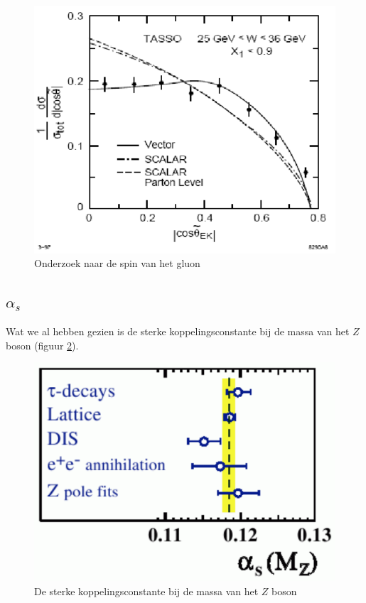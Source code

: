 \documentclass[../main.tex]{subfiles}
\begin{document}
\begin{figure}[h]
    \centering
    \includegraphics[width=0.8\linewidth]{QCD/3jets_results.png}
    \caption{Onderzoek naar de spin van het gluon}%
    \label{fig:3jets_results}
\end{figure}

\subsection{$\alpha_s$}%
\label{sub:_alpha_s_}

Wat we al hebben gezien is de sterke koppelingsconstante bij de massa van het $Z$ boson (figuur \ref{fig:str_kop_z}).

\begin{figure}[h]
    \centering
    \includegraphics[width=0.8\linewidth]{QCD/str_kop_z.png}
    \caption{De sterke koppelingsconstante bij de massa van het $Z$ boson}%
    \label{fig:str_kop_z}
\end{figure}
\end{document}
